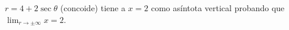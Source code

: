 \item $r = 4 + 2 \sec\theta$ (concoide) tiene a $x = 2$ como asíntota vertical probando que $\lim_{r\to\pm\infty} x = 2$.
